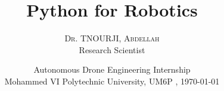 \title[Short title here]{Python for Robotics}
\author{%
    {\textsc{Dr. TNOURJI, Abdellah}} \\[0.5ex]
    Research Scientist %
}
\date{Autonomous Drone Engineering Internship\\Mohammed VI Polytechnic University, UM6P   , \today} 

